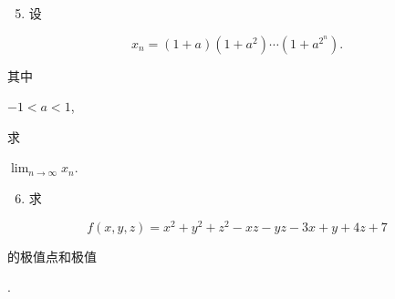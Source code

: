 \documentclass[10pt]{article}
\begin{document}
\begin{enumerate}
  \setcounter{enumi}{4}
  \item \begin{CJK}{UTF8}{mj}设\end{CJK}
\end{enumerate}
$$
x_{n}=(1+a)\left(1+a^{2}\right) \cdots\left(1+a^{2^{n}}\right) .
$$
\begin{CJK}{UTF8}{mj}其中\end{CJK} $-1<a<1$, \begin{CJK}{UTF8}{mj}求\end{CJK} $\lim _{n \rightarrow \infty} x_{n}$.

\begin{enumerate}
  \setcounter{enumi}{5}
  \item \begin{CJK}{UTF8}{mj}求\end{CJK}
\end{enumerate}
$$
f(x, y, z)=x^{2}+y^{2}+z^{2}-x z-y z-3 x+y+4 z+7
$$
\begin{CJK}{UTF8}{mj}的极值点和极值\end{CJK}.
\end{document}
